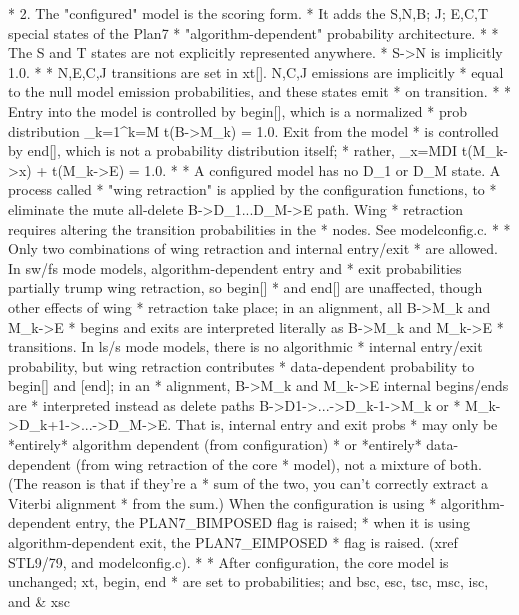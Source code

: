 {%
\begin{cchunk}
 * 2. The "configured" model is the scoring form.
 *    It adds the S,N,B; J; E,C,T special states of the Plan7
 *    "algorithm-dependent" probability architecture.
 *    
 *    The S and T states are not explicitly represented anywhere.
 *    S->N is implicitly 1.0. 
 *    
 *    N,E,C,J transitions are set in xt[]. N,C,J emissions are implicitly
 *    equal to the null model emission probabilities, and these states emit
 *    on transition. 
 *    
 *    Entry into the model is controlled by begin[], which is a normalized
 *    prob distribution \sum_{k=1}^{k=M} t(B->M_k) = 1.0. Exit from the model
 *    is controlled by end[], which is not a probability distribution itself;
 *    rather, \sum_{x=MDI} t(M_k->x) + t(M_k->E) = 1.0. 
 *    
 *    A configured model has no D_1 or D_M state. A process called
 *    "wing retraction" is applied by the configuration functions, to
 *    eliminate the mute all-delete B->D_1...D_M->E path. Wing
 *    retraction requires altering the transition probabilities in the
 *    nodes. See modelconfig.c.
 *    
 *    Only two combinations of wing retraction and internal entry/exit
 *    are allowed. In sw/fs mode models, algorithm-dependent entry and
 *    exit probabilities partially trump wing retraction, so begin[]
 *    and end[] are unaffected, though other effects of wing
 *    retraction take place; in an alignment, all B->M_k and M_k->E
 *    begins and exits are interpreted literally as B->M_k and M_k->E
 *    transitions. In ls/s mode models, there is no algorithmic
 *    internal entry/exit probability, but wing retraction contributes
 *    data-dependent probability to begin[] and [end]; in an
 *    alignment, B->M_k and M_k->E internal begins/ends are
 *    interpreted instead as delete paths B->D1->...->D_k-1->M_k or
 *    M_k->D_k+1->...->D_M->E.  That is, internal entry and exit probs
 *    may only be *entirely* algorithm dependent (from configuration)
 *    or *entirely* data-dependent (from wing retraction of the core
 *    model), not a mixture of both. (The reason is that if they're a
 *    sum of the two, you can't correctly extract a Viterbi alignment
 *    from the sum.) When the configuration is using
 *    algorithm-dependent entry, the PLAN7_BIMPOSED flag is raised;
 *    when it is using algorithm-dependent exit, the PLAN7_EIMPOSED
 *    flag is raised.  (xref STL9/79, and modelconfig.c).
 *    
 *    After configuration, the core model is unchanged; xt, begin, end
 *    are set to probabilities; and bsc, esc, tsc, msc, isc, and & xsc

\end{cchunk}}
